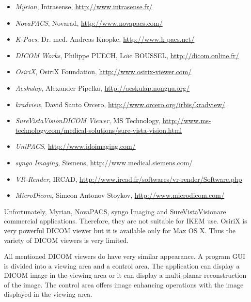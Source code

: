 \begin{itemize}
  \setlength{\itemsep}{0pt}
  \setlength{\parskip}{0pt}
  \setlength{\parsep}{0pt}
\item \emph{Myrian}, Intrasense, \url{http://www.intrasense.fr/}
\item \emph{NovaPACS}, Novarad, \url{http://www.novapacs.com/}
\item \emph{K-Pacs}, Dr. med. Andreas Knopke, \url{http://www.k-pacs.net/}
\item \emph{DICOM Works}, Philippe PUECH, Loïc BOUSSEL, \url{http://dicom.online.fr/}
\item \emph{OsiriX}, OsiriX Foundation, \url{http://www.osirix-viewer.com/}
\item \emph{Aeskulap}, Alexander Pipelka, \url{http://aeskulap.nongnu.org/}
\item \emph{kradview}, David Santo Orcero, \url{http://www.orcero.org/irbis/kradview/}
\item \emph{SureVistaVision\texttrademark DICOM Viewer}, MS Technology, \url{http://www.ms-technology.com/medical-solutions/sure-vista-vision.html}
\item \emph{UniPACS},  \url{http://www.idoimaging.com/}
\item \emph{syngo Imaging}, Siemens, \url{http://www.medical.siemens.com/}
\item \emph{VR-Render}, IRCAD, \url{http://www.ircad.fr/softwares/vr-render/Software.php}
\item \emph{MicroDicom}, Simeon Antonov Stoykov, \url{http://www.microdicom.com/}
\end{itemize}

Unfortunately, Myrian, NovaPACS, syngo Imaging and SureVistaVision\texttrademark are commercial applications. Therefore, they are not suitable for IKEM use. OsiriX is very powerful DICOM viewer but it is available only for Max OS X. Thus the variety of DICOM viewers is very limited.

All mentioned DICOM viewers do have very similar appearance. A program GUI is divided into a viewing area and a control area. The application can display a DICOM image in the viewing area or it can display a multi-planar reconstruction of the image. The control area offers image enhancing operations with the image displayed in the viewing area.

